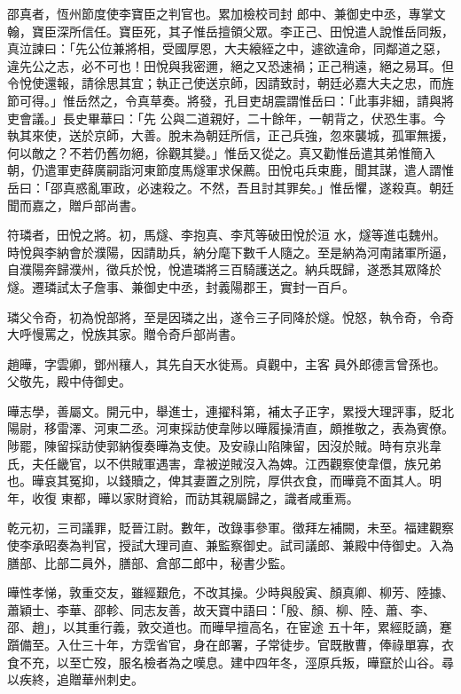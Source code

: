 \begin{pinyinscope}
 邵真者，恆州節度使李寶臣之判官也。累加檢校司封
 郎中、兼御史中丞，專掌文翰，寶臣深所信任。寶臣死，其子惟岳擅領父眾。李正己、田悅遣人說惟岳同叛，真泣諫曰：「先公位兼將相，受國厚恩，大夫縗絰之中，遽欲違命，同鄰道之惡，違先公之志，必不可也！田悅與我密邇，絕之又恐速禍；正己稍遠，絕之易耳。但令悅使還報，請徐思其宜；執正己使送京師，因請致討，朝廷必嘉大夫之忠，而旌節可得。」惟岳然之，令真草奏。將發，孔目吏胡震謂惟岳曰：「此事非細，請與將吏會議。」長史畢華曰：「先
 公與二道親好，二十餘年，一朝背之，伏恐生事。今執其來使，送於京師，大善。脫未為朝廷所信，正己兵強，忽來襲城，孤軍無援，何以敵之？不若仍舊勿絕，徐觀其變。」惟岳又從之。真又勸惟岳遣其弟惟簡入朝，仍遣軍吏薛廣嗣詣河東節度馬燧軍求保薦。田悅屯兵束鹿，聞其謀，遣人謂惟岳曰：「邵真惑亂軍政，必速殺之。不然，吾且討其罪矣。」惟岳懼，遂殺真。朝廷聞而嘉之，贈戶部尚書。



 符璘者，田悅之將。初，馬燧、李抱真、李芃等破田悅於洹
 水，燧等進屯魏州。時悅與李納會於濮陽，因請助兵，納分麾下數千人隨之。至是納為河南諸軍所逼，自濮陽奔歸濮州，徵兵於悅，悅遣璘將三百騎護送之。納兵既歸，遂悉其眾降於燧。遷璘試太子詹事、兼御史中丞，封義陽郡王，實封一百戶。



 璘父令奇，初為悅部將，至是因璘之出，遂令三子同降於燧。悅怒，執令奇，令奇大呼慢罵之，悅族其家。贈令奇戶部尚書。



 趙曄，字雲卿，鄧州穰人，其先自天水徙焉。貞觀中，主客
 員外郎德言曾孫也。父敬先，殿中侍御史。



 曄志學，善屬文。開元中，舉進士，連擢科第，補太子正字，累授大理評事，貶北陽尉，移雷澤、河東二丞。河東採訪使韋陟以曄履操清直，頗推敬之，表為賓僚。陟罷，陳留採訪使郭納復奏曄為支使。及安祿山陷陳留，因沒於賊。時有京兆韋氏，夫任畿官，以不供賊軍遇害，韋被逆賊沒入為婢。江西觀察使韋儇，族兄弟也。曄哀其冤抑，以錢贖之，俾其妻置之別院，厚供衣食，而曄竟不面其人。明年，收復
 東都，曄以家財資給，而訪其親屬歸之，識者咸重焉。



 乾元初，三司議罪，貶晉江尉。數年，改錄事參軍。徵拜左補闕，未至。福建觀察使李承昭奏為判官，授試大理司直、兼監察御史。試司議郎、兼殿中侍御史。入為膳部、比部二員外，膳部、倉部二郎中，秘書少監。



 曄性孝悌，敦重交友，雖經艱危，不改其操。少時與殷寅、顏真卿、柳芳、陸據、蕭穎士、李華、邵軫、同志友善，故天寶中語曰：「殷、顏、柳、陸、蕭、李、邵、趙」，以其重行義，敦交道也。而曄早擅高名，在宦途
 五十年，累經貶謫，蹇躓備至。入仕三十年，方霑省官，身在郎署，子常徒步。官既散曹，俸祿單寡，衣食不充，以至亡歿，服名檢者為之嘆息。建中四年冬，涇原兵叛，曄竄於山谷。尋以疾終，追贈華州刺史。




\end{pinyinscope}
